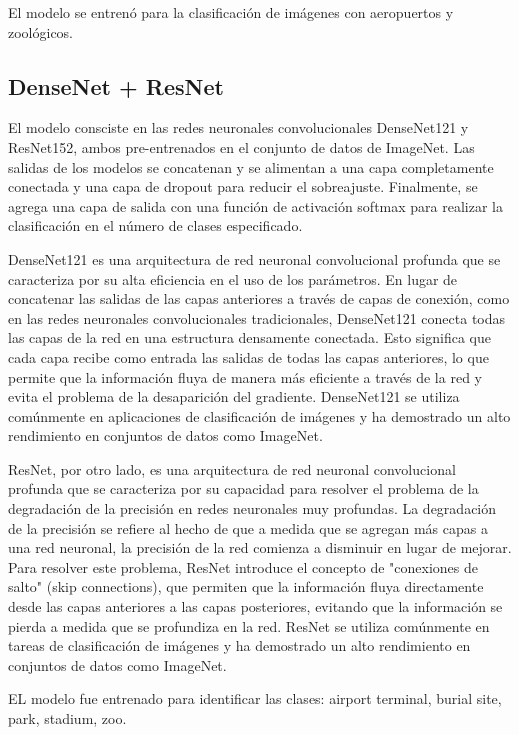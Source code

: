 \documentclass[article]{llncs}
\begin{document}
El modelo se entren\'o para la clasificación de im\'agenes con aeropuertos y zool\'ogicos.


\subsection{DenseNet + ResNet}

El modelo consciste en las redes neuronales convolucionales DenseNet121 y ResNet152, ambos pre-entrenados en el conjunto 
de datos de ImageNet. Las salidas de los modelos se concatenan y se alimentan a una capa completamente conectada y una 
capa de dropout para reducir el sobreajuste. Finalmente, se agrega una capa de salida con una función de activación 
softmax para realizar la clasificación en el número de clases especificado.  

DenseNet121 es una arquitectura de red neuronal convolucional profunda que se caracteriza por su alta eficiencia en el 
uso de los parámetros. En lugar de concatenar las salidas de las capas anteriores a través de capas de conexión, como en 
las redes neuronales convolucionales tradicionales, DenseNet121 conecta todas las capas de la red en una estructura 
densamente conectada. Esto significa que cada capa recibe como entrada las salidas de todas las capas anteriores, lo que 
permite que la información fluya de manera más eficiente a través de la red y evita el problema de la desaparición del 
gradiente. DenseNet121 se utiliza comúnmente en aplicaciones de clasificación de imágenes y ha demostrado un alto 
rendimiento en conjuntos de datos como ImageNet.

ResNet, por otro lado, es una arquitectura de red neuronal convolucional profunda que se caracteriza por su capacidad 
para resolver el problema de la degradación de la precisión en redes neuronales muy profundas. La degradación de la 
precisión se refiere al hecho de que a medida que se agregan más capas a una red neuronal, la precisión de la red 
comienza a disminuir en lugar de mejorar. Para resolver este problema, ResNet introduce el concepto de "conexiones de 
salto" (skip connections), que permiten que la información fluya directamente desde las capas anteriores a las capas 
posteriores, evitando que la información se pierda a medida que se profundiza en la red. ResNet se utiliza comúnmente en 
tareas de clasificación de imágenes y ha demostrado un alto rendimiento en conjuntos de datos como ImageNet.

EL modelo fue entrenado para identificar las clases: airport terminal, burial site, park, stadium, zoo.
\end{document}

